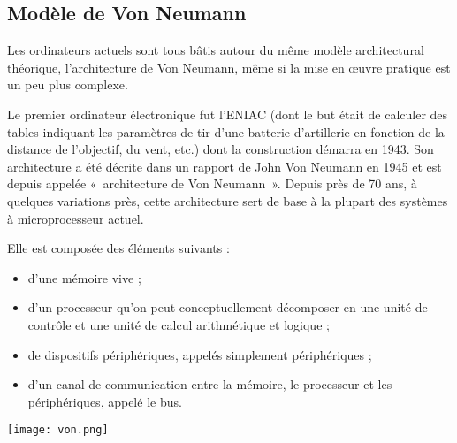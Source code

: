 \subsection{Modèle de Von Neumann}

Les ordinateurs actuels sont tous bâtis
autour du même modèle architectural théorique, l’architecture de Von Neumann, même
si la mise en œuvre pratique est un peu plus complexe.

Le premier ordinateur électronique fut l’ENIAC
(dont le but était de calculer des tables indiquant les paramètres de tir d’une batterie d’artillerie
en fonction de la distance de l’objectif, du vent, etc.) dont la construction démarra
en 1943. 
Son architecture a été décrite dans un rapport de John Von Neumann en 1945 et
est depuis appelée «~architecture de Von Neumann~». Depuis près de 70 ans, à quelques variations
près, cette  architecture sert de base à la plupart des systèmes à microprocesseur actuel. 

\begin{minipage}[c]{.49\linewidth}
Elle est composée des éléments suivants :
\begin{itemize}
\item d'une mémoire vive ;
\item d'un processeur qu'on peut conceptuellement décomposer en une unité de contrôle et
une unité de calcul arithmétique et logique ;
\item de dispositifs périphériques, appelés simplement périphériques ;
\item d'un canal de communication entre la mémoire, le processeur et les périphériques, appelé
le bus.
\end{itemize}
\end{minipage} \hfill
\begin{minipage}[c]{.49\linewidth}
\begin{center}
\texttt{[image: von.png]}
\end{center}
\end{minipage}

